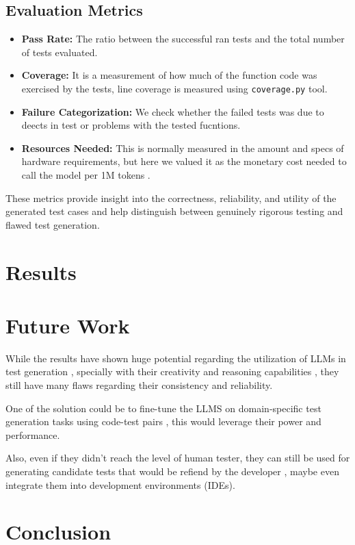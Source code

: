 \documentclass[12pt]{article}
\begin{document}
\subsection{Evaluation Metrics}

\begin{itemize}
    \item \textbf{ Pass Rate:} The ratio between the successful ran tests and the total number of tests evaluated.
    \item \textbf{ Coverage:} It is a measurement of how much of the function code was exercised by the tests, line coverage is measured using \texttt{coverage.py} tool.
    \item \textbf{ Failure Categorization:} We check whether the failed tests was due to deects in test or problems with the tested fucntions.
    \item \textbf{ Resources Needed:} This is normally measured in the amount and specs of hardware requirements, but here we valued it as the monetary cost needed to call the model per 1M tokens .
\end{itemize}

These metrics provide insight into the correctness, reliability, and utility of the generated test cases and help distinguish between genuinely rigorous testing and flawed test generation.


\section {Results}


\section {Future Work}

While the results have shown huge potential regarding the utilization of LLMs in test generation , specially with their creativity and reasoning capabilities , they still have many flaws regarding their consistency and reliability.

One of the solution could be to fine-tune the LLMS on domain-specific test generation tasks using code-test pairs , this would leverage their power and performance.

Also, even if they didn't reach the level of human tester, they can still be used for generating candidate tests that would be refiend by the developer , maybe even integrate them into development environments (IDEs).

\section {Conclusion}




\end{document}
